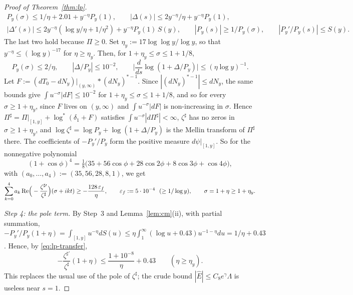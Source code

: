 \begin{proof}[Proof of Theorem~\ref{thm:lp}]
\begin{gather*}
  P_y(\sigma)\le1/\eta+2.01+y^{-\eta}P_y(1),\qquad|\Delta(s)|\le2y^{-\eta}/\eta+y^{-\eta}P_y(1),\\
  |\Delta'(s)|\le2y^{-\eta}(\log y/\eta+1/\eta^2)+y^{-\eta}P_y(1)\,S(y),\qquad|P_y(s)|\ge1/P_y(\sigma),\qquad
  |P_y'/P_y(s)|\le S(y).
\end{gather*}
The last two hold because $\Pi\ge0$. Set $\eta_y:=17\log\log y/\log y$, so that $y^{-\eta}\le(\log y)^{-17}$ for
$\eta\ge\eta_y$. Then, for $1+\eta_y\le\sigma\le1+1/8$,
\begin{equation}\label{eq:lp-transfer}
  P_y(\sigma)\le2/\eta,\qquad|\Delta/P_y|\le10^{-2},\qquad\Big|\frac{d}{ds}\log(1+\Delta/P_y)\Big|\le(\eta\log y)^{-1}.
\end{equation}
Let $F:=(dT_0-dN_y)|_{(y,\infty)}*(dN_y)^{*-1}$. Since $|(dN_y)^{*-1}|\le dN_y$, the same bounds give
$\int u^{-\sigma}|dF|\le10^{-2}$ for $1+\eta_y\le\sigma\le1+1/8$, and so for every $\sigma\ge1+\eta_y$, since $F$ lives on $(y,\infty)$
and $\int u^{-\sigma}|dF|$ is non-increasing in $\sigma$.
Hence $\Pi^\sharp=\Pi|_{[1,y]}+\log^*(\delta_1+F)$ satisfies $\int u^{-\sigma}|d\Pi^\sharp|<\infty$,
$\zeta^\sharp$ has no zeros in $\sigma\ge1+\eta_y$, and $\log\zeta^\sharp=\log P_y+\log(1+\Delta/P_y)$ is the Mellin transform of
$\Pi^\sharp$ there. The coefficients of $-P_y'/P_y$ form the positive measure $d\psi|_{[1,y]}$. So for the nonnegative
polynomial
\[
  (1+\cos\phi)^4=\tfrac18\big(35+56\cos\phi+28\cos2\phi+8\cos3\phi+\cos4\phi\big),
\]
with $(a_0,\dots,a_4):=(35,56,28,8,1)$, we get
\begin{equation}\label{eq:lp-341}
  \sum_{k=0}^4a_k\,\mathrm{Re}\Big(-\frac{\zeta^{\sharp\prime}}{\zeta^\sharp}\Big)(\sigma+ikt)\ge-\frac{128\,\varepsilon_f}{\eta},
  \qquad\varepsilon_f:=5\cdot10^{-4}\ \ (\ge1/\log y),\qquad\sigma=1+\eta\ge1+\eta_y .
\end{equation}

\emph{Step 4: the pole term.} By Step~3 and Lemma~\ref{lem:cm}(ii), with partial summation,
$-P_y'/P_y(1+\eta)=\int_{[1,y]}u^{-\eta}dS(u)\le\eta\int_1^\infty(\log u+0.43)u^{-1-\eta}du=1/\eta+0.43$. Hence, by
\eqref{eq:lp-transfer},
\begin{equation}\label{eq:lp-pole}
  -\frac{\zeta^{\sharp\prime}}{\zeta^\sharp}(1+\eta)\le\frac{1+10^{-8}}\eta+0.43\qquad(\eta\ge\eta_y).
\end{equation}
This replaces the usual use of the pole of $\zeta^\sharp$; the crude bound $|\hat E|\le C_8e^\gamma\Lambda$ is useless near
$s=1$.


\end{proof}
